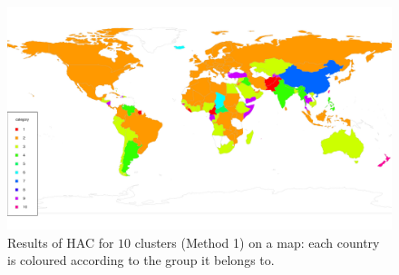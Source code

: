 \documentclass[a4paper,12pt]{article}
\numberwithin{equation}{section}
\begin{document}





\newpage 
\FloatBarrier
\begin{figure}[t!]
\begin{minipage}[t]{0.98\textwidth}
\includegraphics[width=\textwidth]{plots/choropleth_10}
\caption{Results of HAC for $10$ clusters (Method 1) on a map: each country is coloured according to the group it belongs to.}\label{fig:map_10cl}
\end{minipage}
\end{figure}
\end{document}
